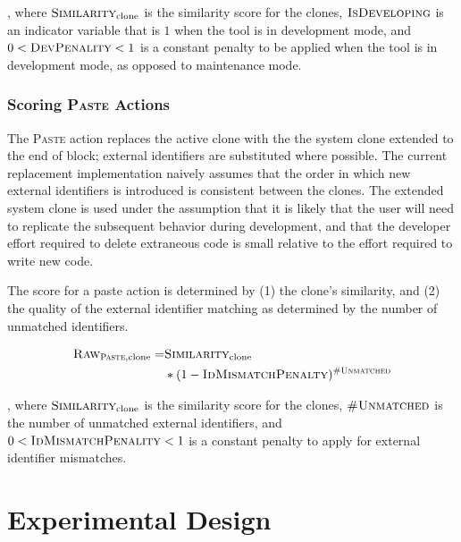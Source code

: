 \documentclass[nocopyrightspace,10pt]{sigplanconf}
\begin{document}
\noindent, where $\textsc{Similarity}_{\text{clone}}$ is the
similarity score for the clones, $\textsc{IsDeveloping}$ is an
indicator variable that is $1$ when the tool is in development mode,
and $0 < \textsc{DevPenality} < 1$ is a constant penalty to be applied
when the tool is in development mode, as opposed to maintenance mode.

\subsubsection{Scoring \textsc{Paste} Actions}
The \textsc{Paste} action replaces the active clone with the the
system clone extended to the end of block; external identifiers are
substituted where possible. The current replacement implementation
naively assumes that the order in which new external identifiers is
introduced is consistent between the clones.  The extended system
clone is used under the assumption that it is likely that the user
will need to replicate the subsequent behavior during development, and
that the developer effort required to delete extraneous code is small
relative to the effort required to write new code.

The score for a paste action is determined by (1) the clone's
similarity, and (2) the quality of the external identifier matching as
determined by the number of unmatched identifiers.

\begin{align*}
  \textsc{Raw}_{\textsc{Paste}, \text{clone}} = & \textsc{Similarity}_{\text{clone}} \\ 
   & * (1 - \textsc{IdMismatchPenalty})^{\textsc{\#Unmatched}}
\end{align*}

\noindent, where $\textsc{Similarity}_{\text{clone}}$ is the
similarity score for the clones, $\textsc{\#Unmatched}$ is the number
of unmatched external identifiers, and $0 <
\textsc{IdMismatchPenality} < 1$ is a constant penalty to apply for
external identifier mismatches.

\section{Experimental Design}
\label{sec:eval}

\end{document}
